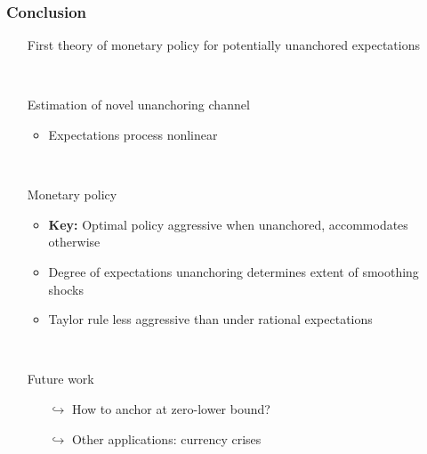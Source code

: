 \documentclass[10pt]{beamer}
\def\movei{12 }
\begin{document}
\begin{frame}
	\frametitle{Conclusion}

\vspace{0.5cm}
	
\begin{itemize}
\item[] First theory of monetary policy for potentially unanchored expectations 

\

\item[] Estimation of novel unanchoring channel
\vspace{0.1cm}
	\begin{itemize}
	\item Expectations process nonlinear
%
	\end{itemize}
\


\item[] Monetary policy
\vspace{0.1cm}

	\begin{itemize}
	\item \textbf{Key:} Optimal policy aggressive when unanchored, accommodates otherwise
	\vspace{0.1cm}
	
	\item Degree of expectations unanchoring determines extent of smoothing shocks
	\vspace{0.1cm}



	\item Taylor rule less aggressive than under rational expectations
	\end{itemize}
	
\


\item[] Future work
\vspace{0.1cm}

\begin{itemize}
\item[$\hookrightarrow$]  How to anchor at zero-lower bound?
\vspace{0.1cm}

\item[$\hookrightarrow$]  Other applications: currency crises
\end{itemize}


\end{itemize}


\end{frame}
\end{document}
